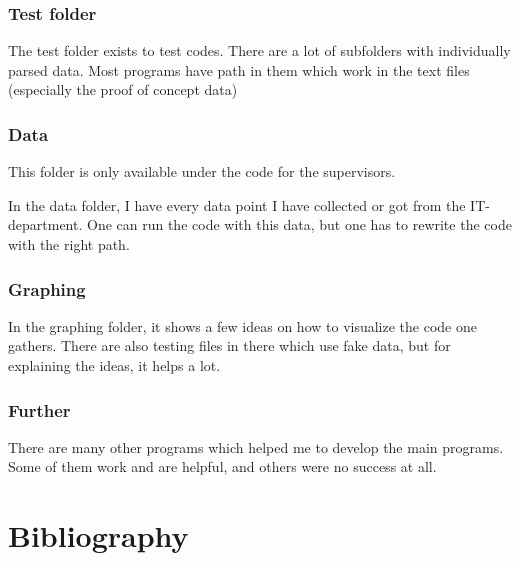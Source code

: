 \documentclass[11pt]{article}
\begin{document}
\subsubsection{Test folder}
The test folder exists to test codes. There are a lot of subfolders with individually parsed data. Most programs have path in them which work in the text files (especially the proof of concept data)

\subsubsection{Data}
This folder is only available under the code for the supervisors.

In the data folder, I have every data point I have collected or got from the IT-department. One can run the code with this data, but one has to rewrite the code with the right path.

\subsubsection{Graphing}
In the graphing folder, it shows a few ideas on how to visualize the code one gathers. There are also testing files in there which use fake data, but for explaining the ideas, it helps a lot.

\subsubsection{Further}
There are many other programs which helped me to develop the main programs. Some of them work and are helpful, and others were no success at all. 



\section{Bibliography}
\printbibliography[title={offline},nottype={online}]

\printbibliography[title={online},type={online}]
\listoffigures
\lstlistoflistings
\end{document}
